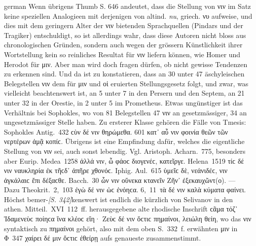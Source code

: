 \begin{otherlanguage*}{german}
Wenn übrigens Thumb S. 646 andeutet, dass die Stellung von νιν im Satz keine speziellen Analogieen mit derjenigen von altind. \emph{nu}, griech. νυ aufweise, und dies mit dem geringern Alter der νιν bietenden Sprachquellen (Pindars und der Tragiker) entschuldigt, so ist allerdings wahr, dass diese Autoren nicht bloss aus chronologischen Gründen, sondern auch wegen der grössern Künstlichkeit ihrer Wortstellung kein so reinliches Resultat für νιν liefern können, wie Homer und Herodot für μιν. Aber man wird doch fragen dürfen, ob nicht gewisse Tendenzen zu erkennen sind. Und da ist zu konstatieren, dass an 30 unter 47 äschyleischen Belegstellen νιν dem für μιν und οἱ eruierten Stellungsgesetz folgt, und zwar, was vielleicht beachtenswert ist, an 5 unter 7 in den Persern und den Septem, an 21 unter 32 in der Orestie, in 2 unter 5 im Prometheus. Etwas ungünstiger ist das Verhältnis bei Sophokles, wo von 81 Belegstellen 47 νιν an gesetzmässiger, 34 an ungesetzmässiger Stelle haben. Zu ersterer Klasse gehören die Fälle von Tmesis: Sophokles Antig.~432 ϲὺν δέ νιν θηρώμεθα. 601 κατ᾽ αὖ νιν φοινία θεῶν τῶν νερτέρων ἀμᾷ κοπίϲ. Übrigens ist eine Empfindung dafür, welches die eigentliche Stellung von νιν sei, auch sonst lebendig. Vgl. Aristoph. Acharn.~775, besonders aber Eurip. Medea~1258 ἀλλά νιν, ὦ φάοϲ διογενέϲ, κατεῖργε. Helena~1519 τίϲ δέ νιν ναυκληρία ἐκ τῆϲδ᾽ ἀπῆρε χθονόϲ. Iphig. Aul.~615 ὑμεῖϲ δὲ, νεάνιδέϲ, νιν ἀγκάλαιϲ ἔπι δέξαϲθε. Bacch.~30 ὧν νιν οὕνεκα κτανεῖν Ζῆν᾽ ἐξεκαυχῶντ(ο). — Dazu Theokrit.~2,~103 ἐγὼ δέ νιν ὡϲ ἐνόηϲα. 6,~11~τὰ δέ νιν καλὰ κύματα φαίνει. Höchst bemer-\hypertarget{p342}{\emph{[S. 342]}}\label{p342}kenswert ist endlich die kürzlich von Selivanov in den athen. Mitteil.~XVI~112~ff. herausgegebene alte rhodische Inschrift ϲᾶμα τόζ᾽ Ἰδαμενεὺϲ ποίηϲα ἵνα κλέοϲ εἴη· Ζεὺϲ δέ νιν ὅϲτιϲ πημαίνοι, λειώλη θείη, wo das νιν syntaktisch zu πημαίνοι gehört, also mit dem oben S.~332~f. erwähnten μιν in Φ~347 χαίρει δέ μιν ὅϲτιϲ ἐθείρῃ aufs genaueste zusammenstimmt.


\end{otherlanguage*}
